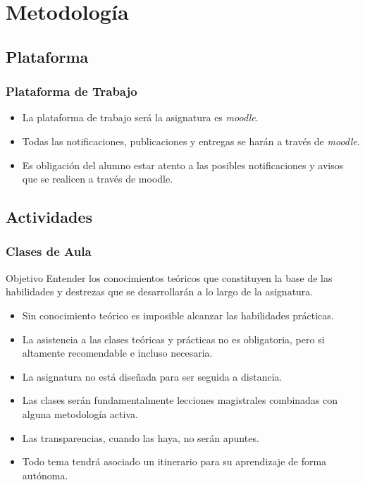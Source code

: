 \documentclass[animated,a4paper,slidestop,xcolor=pst,blue]{beamer}
\begin{document}
\section{Metodología}

\subsection{Plataforma}

\begin{frame}[c]
	\frametitle{Plataforma de Trabajo}
	\begin{itemize}
		\item<1-> La plataforma de trabajo será la asignatura es \emph{moodle}.
		\item<2-> Todas las notificaciones, publicaciones y entregas se harán a través de \emph{moodle}.
		\item<3-> \alert{Es obligación del alumno estar atento a las posibles notificaciones y avisos que se realicen a través de moodle}.
	\end{itemize}
\end{frame}

\subsection{Actividades}

\begin{frame}
	\frametitle{Clases de Aula}
	\begin{block}{Objetivo}
        Entender los conocimientos teóricos que constituyen la base de las habilidades y destrezas que se desarrollarán a lo largo de la asignatura.
	\end{block}
	\begin{itemize}
        \item<2-> Sin conocimiento teórico es imposible alcanzar las habilidades prácticas.
        \item<3-> La asistencia a las clases teóricas y prácticas no es obligatoria, \alert{pero si altamente recomendable e incluso necesaria}.
        \item<4-> La asignatura no está diseñada para ser seguida a distancia.
        \item<5-> Las clases serán fundamentalmente lecciones magistrales combinadas con alguna metodología activa.
        \item<6-> \alert{Las transparencias}, cuando las haya, \alert{no serán apuntes}.
        \item<7-> Todo tema tendrá asociado un itinerario para su aprendizaje de forma autónoma.
	\end{itemize}
\end{frame}
\end{document}
